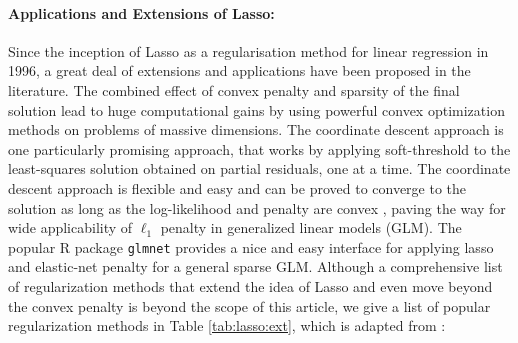 \documentclass[11pt]{article}
\begin{document}
\paragraph{Applications and Extensions of Lasso:} Since the inception of Lasso as a regularisation method for linear regression in 1996, a great deal of extensions and applications have been proposed in the literature. The combined effect of convex penalty and sparsity of the final solution lead to huge computational gains by using powerful convex optimization methods on problems of massive dimensions. The coordinate descent approach \citep{friedman2007pathwise,friedman2010regularization} is one particularly promising approach, that works by applying soft-threshold to the least-squares solution obtained on partial residuals, one at a time. The coordinate descent approach is flexible and easy and can be proved to converge to the solution as long as the log-likelihood and penalty are convex \citep{tseng2001convergence}, paving the way for wide applicability of $\ell_1$ penalty in generalized linear models (GLM). The popular R package \texttt{glmnet} provides a nice and easy interface for applying lasso and elastic-net penalty for a general sparse GLM. Although a comprehensive list of regularization methods that extend the idea of Lasso and even move beyond the convex penalty is beyond the scope of this article, we give a list of popular regularization methods in Table \ref{tab:lasso:ext}, which is adapted from \citet{tibshirani2014praise}:
\end{document}
